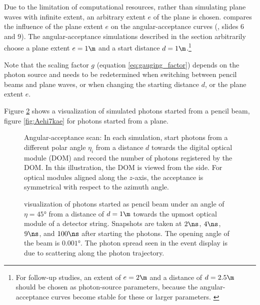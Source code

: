 Due to the limitation of computational resources, rather than simulating plane waves with infinite extent, an arbitrary extent $e$ of the plane is chosen. \rongen \cite{martindardupdate,rongenswedishcamera} compares the influence of the plane extent $e$ on the angular-acceptance curves (\cite{martindardupdate}, slides 6 and 9). The angular-acceptance simulations described in the section arbitrarily choose a plane extent $e = 1\m$ and a start distance $d = 1\m$.\footnote{For follow-up studies, an extent of $e=2\m$ and a distance of $d=2.5\m$ should be chosen as photon-source parameters, because the angular-acceptance curves become stable for these or larger parameters. \cite{rongenswedishcamera}}

Note that the scaling factor $g$ (equation \ref{eq:gauging_factor}) depends on the photon source and needs to be redetermined when switching between pencil beams and plane waves, or when changing the starting distance $d$, or the plane extent $e$.

Figure \ref{fig:Paihah7h} shows a \steamshovel visualization of simulated photons started from a pencil beam, figure \ref{fig:Aehi7kae} for photons started from a plane.


\begin{figure}[htbp]
  \hfill
  \caption{Angular-acceptance scan: In each simulation, start photons from a different polar angle $\eta_i$ from a distance $d$ towards the digital optical module (DOM) and record the number of photons registered by the DOM. In this illustration, the DOM is viewed from the side. For optical modules aligned along the $z$-axis, the acceptance is symmetrical with respect to the azimuth angle.}
  \label{fig:quie8Oof}
\end{figure}

\begin{figure}[htbp]
  \hfill
  \hfill
  \hfill
  \caption{\steamshovel visualization of photons started as pencil beam under an angle of $\eta = \ang{45}$ from a distance of $d = 1\m$ towards the upmost optical module of a detector string. Snapshots are taken at $2\ns$, $4\ns$, $9\ns$, and $100\ns$ after starting the photons. The opening angle of the beam is $\ang{0.001}$. The photon spread seen in the event display is due to scattering along the photon trajectory.}
  \label{fig:Paihah7h}
\end{figure}


